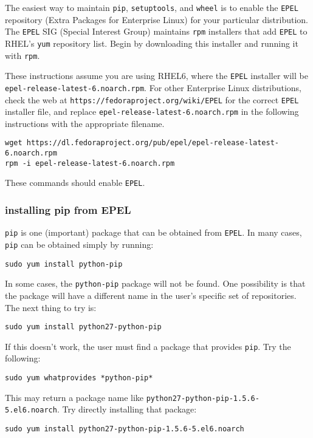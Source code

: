 The easiest way to maintain \verb|pip|, \verb|setuptools|, and \verb|wheel|
is to enable the \verb|EPEL| repository (Extra Packages for Enterprise Linux)
for your particular distribution.
The \verb|EPEL| SIG (Special Interest Group) 
maintains \verb|rpm| installers that add \verb|EPEL| 
to RHEL's \verb|yum| repository list.
Begin by downloading this installer
and running it with \verb|rpm|.

These instructions assume you are using RHEL6,
where the \verb|EPEL| installer will be 
\verb|epel-release-latest-6.noarch.rpm|.
For other Enterprise Linux distributions,
check the web at \verb|https://fedoraproject.org/wiki/EPEL|
for the correct \verb|EPEL| installer file,
and replace \verb|epel-release-latest-6.noarch.rpm|
in the following instructions with the appropriate filename.
\begin{lstlisting}
wget https://dl.fedoraproject.org/pub/epel/epel-release-latest-6.noarch.rpm
rpm -i epel-release-latest-6.noarch.rpm  
\end{lstlisting}
These commands should enable \verb|EPEL|.


\subsubsection{installing pip from EPEL}
\label{subsubsec:pip_from_epel}

\verb|pip| is one (important) package that can be obtained from \verb|EPEL|.
In many cases, \verb|pip| can be obtained simply by running:
\begin{lstlisting}
sudo yum install python-pip
\end{lstlisting}
In some cases, the \verb|python-pip| package will not be found.
One possibility is that the package will have a different name
in the user's specific set of repositories.
The next thing to try is:
\begin{lstlisting}
sudo yum install python27-python-pip
\end{lstlisting}
If this doesn't work, 
the user must find a package that provides \verb|pip|.
Try the following:
\begin{lstlisting}
sudo yum whatprovides *python-pip*
\end{lstlisting}
This may return a package name like \newline 
\verb|python27-python-pip-1.5.6-5.el6.noarch|.
Try directly installing that package:
\begin{lstlisting}
sudo yum install python27-python-pip-1.5.6-5.el6.noarch
\end{lstlisting}

